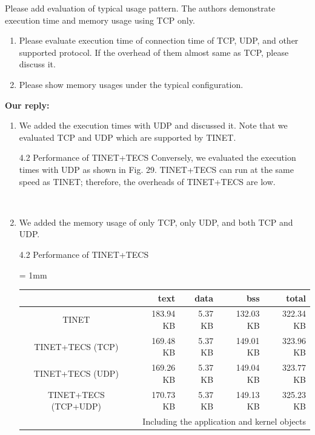 \documentclass{article}
\begin{document}
\begin{enumerate}
\begin{flushleft}
Please add evaluation of typical usage pattern. The authors demonstrate execution time and memory usage using TCP only. 

\begin{enumerate}
\item Please evaluate execution time of connection time of TCP, UDP, and other supported protocol. If the overhead of them almost same as TCP, please discuss it. 

\item Please show memory usages under the typical configuration.
\end{enumerate}
\end{flushleft}

\begin{flushleft}
\textbf{Our reply:}

\begin{enumerate}
\item
    We added the execution times with UDP and discussed it.
    Note that we evaluated TCP and UDP which are supported by TINET.

\begin{itembox}[|]{4.2 Performance of TINET+TECS}
Conversely, we evaluated the execution times with UDP as shown in Fig. 29.
TINET+TECS can run at the same speed as TINET; therefore, the overheads of TINET+TECS are low.
\end{itembox}\\

\item
    We added the memory usage of only TCP, only UDP, and both TCP and UDP.

\begin{itembox}[|]{4.2 Performance of TINET+TECS}
    \centering
    {\tabcolsep = 1mm
    \begin{tabular}{c|r|r|r|r}
        \hline\hline
                               &   text       &  data    &   bss      &  total     \\ \hline
        TINET                  &   183.94 KB  &  5.37 KB &  132.03 KB &  322.34 KB \\
        TINET+TECS (TCP)       &   169.48 KB  &  5.37 KB &  149.01 KB &  323.96 KB \\
        TINET+TECS (UDP)       &   169.26 KB  &  5.37 KB &  149.04 KB &  323.77 KB \\
        TINET+TECS (TCP+UDP)   &   170.73 KB  &  5.37 KB &  149.13 KB &  325.23 KB \\
        \hline
        \multicolumn{5}{r}{Including the application and kernel objects}
    \end{tabular}
    }
\end{itembox}\\

\end{enumerate}
\end{flushleft}


\end{enumerate}
\end{document}
